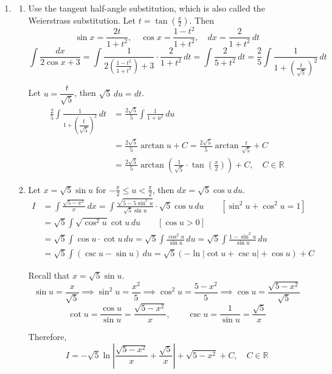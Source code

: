 \documentclass[a4paper, 12pt]{article}
\begin{document}
\begin{enumerate}[leftmargin=*,label=\textbf{\arabic*.}]
\item
\begin{enumerate}[leftmargin=*,label=\textbf{\alph*.}]
\item Use the tangent half-angle substitution, which is also called the Weierstrass substitution. Let $t=\tan\left(\frac x2\right)$. Then
\[\sin x={\frac{2t}{1+t^{2}}},\quad\cos x={\frac{1-t^{2}}{1+t^{2}}},\quad dx={\frac2{1+t^{2}}}\,dt\]
\[\int\frac{dx}{2\cos x+3}=\int\frac1{2\left(\frac{1-t^2}{1+t^2}\right)+3}\cdot\frac2{1+t^2}\,dt=\int\frac2{5+t^2}\,dt=\frac25\int\frac1{1+\left(\frac t{\sqrt5}\right)^2}\,dt\]

Let $u=\dfrac t{\sqrt5}$, then $\sqrt5\,du=dt$.
\begin{align*}\frac25\int\frac1{1+\left(\dfrac t{\sqrt5}\right)^2}\,dt&=\frac{2\sqrt5}5\int\frac1{1+u^2}\,du\\[1em]&=\frac{2\sqrt5}5\arctan u+C=\frac{2\sqrt5}5\arctan\frac t{\sqrt5}+C\\[1em]&=\boxed{\frac{2\sqrt5}5\arctan\left(\frac1{\sqrt5}\cdot\tan\left(\frac x2\right)\right)+C,\quad C\in\mathbb{R}}\end{align*}

\item Let $\displaystyle x=\sqrt5\sin u$ for $\displaystyle-\frac\pi2\leq u<\frac\pi2$, then $dx=\displaystyle\sqrt5\cos u\,du$.
\begin{align*}I&=\int\frac{\sqrt{5-x^2}}{x}\,dx=\int\frac{\sqrt{5-5\sin^2u}}{\sqrt5\sin u}\cdot\sqrt5\cos u\,du\qquad\left[\sin^2u+\cos^2u=1\right]\\[1em]&=\sqrt5\int\sqrt{\cos^2u}\cot u\,du\qquad\left[\cos u>0\right]\\[1em]&=\sqrt5\int\cos u\cdot\cot u\,du=\sqrt5\int\frac{\cos^2u}{\sin u}\,du=\sqrt5\int\frac{1-\sin^2u}{\sin u}\,du\\[1em]&=\sqrt5\int\left(\csc u-\sin u\right)\,du=\sqrt5\left(-\ln\left|\cot u+\csc u\right|+\cos u\right)+C\end{align*}

Recall that $\displaystyle x=\sqrt5\sin u$.
\[\sin u=\frac x{\sqrt5}\implies\sin^2u=\frac{x^2}5\implies\cos^2 u=\frac{5-x^2}5\implies\cos u=\frac{\sqrt{5-x^2}}{\sqrt5}\]
\[\cot u=\frac{\cos u}{\sin u}=\frac{\sqrt{5-x^2}}x,\qquad\csc u=\frac1{\sin u}=\frac{\sqrt5}x\]

Therefore,
\[\boxed{I=-\sqrt5\ln\left|\frac{\sqrt{5-x^2}}x+\frac{\sqrt5}x\right|+\sqrt{5-x^2}+C,\quad C\in\mathbb{R}}\]


\end{enumerate}
\end{enumerate}
\end{document}
